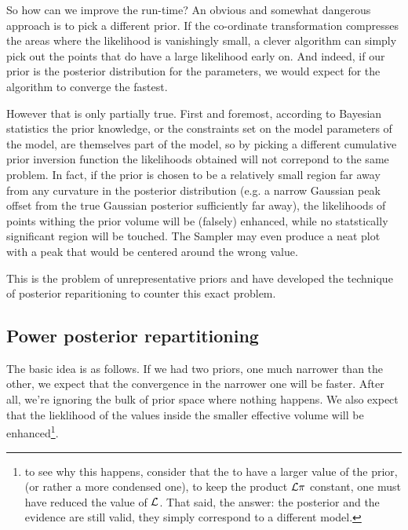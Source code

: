 \documentclass[usenatbib]{mnras}
\begin{document}
So how can we improve the run-time? An obvious and somewhat
dangerous approach is to pick a different prior. If the co-ordinate
transformation compresses the areas where the likelihood is
vanishingly small, a clever algorithm can simply pick out the
points that do have a large likelihood early on. And indeed, if our
prior is the posterior distribution for the parameters, we would
expect for the algorithm to converge the fastest. 

However that is only partially true. First and foremost, according
to Bayesian statistics the prior knowledge, or the constraints set
on the model parameters of the model, are themselves part of the
model, so by picking a different cumulative prior inversion function the
likelihoods obtained will not correpond to the same problem. In
fact, if the prior is chosen to be a relatively small region far
away from any curvature in the posterior distribution (e.g. a
narrow Gaussian peak offset from the true Gaussian posterior
sufficiently far away), the likelihoods of points withing the prior
volume will be (falsely) enhanced, while no statstically
significant region will be touched. The Sampler may even produce a
neat plot with a peak that would be centered around the wrong
value.

This is the problem of unrepresentative priors and
\citeauthor*{chen-ferroz-hobson} have developed the technique of
posterior reparitioning to counter this exact problem.


\subsection{Power posterior repartitioning}
\label{sec:org067415a}

The basic idea is as follows. If we had two priors, one much
narrower than the other, we expect that the convergence in the
narrower one will be faster. After all, we're ignoring the bulk of
prior space where nothing happens. We also expect that the
lieklihood of the values inside the smaller effective volume will
be enhanced\footnote{to see why this happens, consider that the to   have a larger value of the prior, (or rather a more condensed one),   to keep the product \(\cal L \pi\) constant, one must have reduced   the value of \(\cal L\). That said, the answer: the posterior and   the evidence are still valid, they simply correspond to a different  model.}. 
\end{document}
